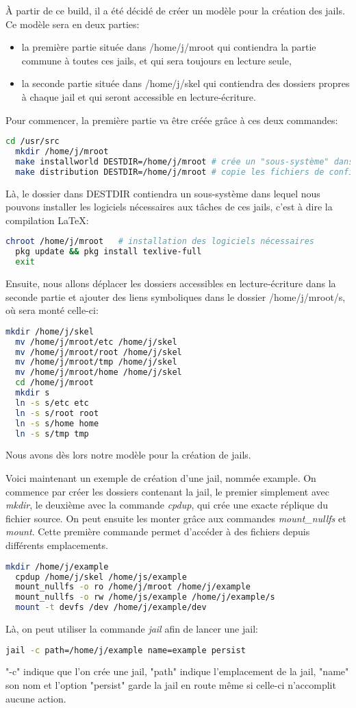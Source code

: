 \documentclass[10pt,a4paper]{article}
\begin{document}
À partir de ce build, il a été décidé de créer un modèle pour la création des jails. Ce modèle sera en deux parties:
\begin{itemize}
  \item la première partie située dans /home/j/mroot qui contiendra la partie commune à toutes ces jails, et qui sera toujours en lecture seule,
  \item la seconde partie située dans /home/j/skel qui contiendra des dossiers propres à chaque jail et qui seront accessible en lecture-écriture.
\end{itemize}
Pour commencer, la première partie va être créée grâce à ces deux commandes:
\begin{lstlisting}[language=bash]
  cd /usr/src
  mkdir /home/j/mroot
  make installworld DESTDIR=/home/j/mroot # crée un "sous-système" dans le dossier DESTDIR
  make distribution DESTDIR=/home/j/mroot # copie les fichiers de configuration dans la jail
\end{lstlisting}
Là, le dossier dans DESTDIR contiendra un sous-système dans lequel nous pouvons installer les logiciels nécessaires aux tâches de ces jails, c'est à dire la compilation \LaTeX:
\begin{lstlisting}[language=bash]
  chroot /home/j/mroot   # installation des logiciels nécessaires
  pkg update && pkg install texlive-full
  exit
\end{lstlisting}
Ensuite, nous allons déplacer les dossiers accessibles en lecture-écriture dans la seconde partie et ajouter des liens symboliques dans le dossier /home/j/mroot/s, où sera monté celle-ci:
\begin{lstlisting}[language=bash]
  mkdir /home/j/skel
  mv /home/j/mroot/etc /home/j/skel
  mv /home/j/mroot/root /home/j/skel
  mv /home/j/mroot/tmp /home/j/skel
  mv /home/j/mroot/home /home/j/skel
  cd /home/j/mroot
  mkdir s
  ln -s s/etc etc
  ln -s s/root root
  ln -s s/home home
  ln -s s/tmp tmp
\end{lstlisting}
Nous avons dès lors notre modèle pour la création de jails.

Voici maintenant un exemple de création d'une jail, nommée example. On commence par créer les dossiers contenant la jail, le premier simplement avec \emph{mkdir}, le deuxième avec la commande \emph{cpdup}, qui crée une exacte réplique du fichier source. On peut ensuite les monter grâce aux commandes \emph{mount\_nullfs} et \emph{mount}. Cette première commande permet d'accéder à des fichiers depuis différents emplacements.
\begin{lstlisting}[language=bash]
  mkdir /home/j/example
  cpdup /home/j/skel /home/js/example
  mount_nullfs -o ro /home/j/mroot /home/j/example
  mount_nullfs -o rw /home/js/example /home/j/example/s
  mount -t devfs /dev /home/j/example/dev
\end{lstlisting}
Là, on peut utiliser la commande \emph{jail} afin de lancer une jail:
\begin{lstlisting}[language=bash]
  jail -c path=/home/j/example name=example persist
\end{lstlisting}
"-c" indique que l'on crée une jail, "path" indique l'emplacement de la jail, "name" son nom et l'option "persist" garde la jail en route même si celle-ci n'accomplit aucune action.
\end{document}

